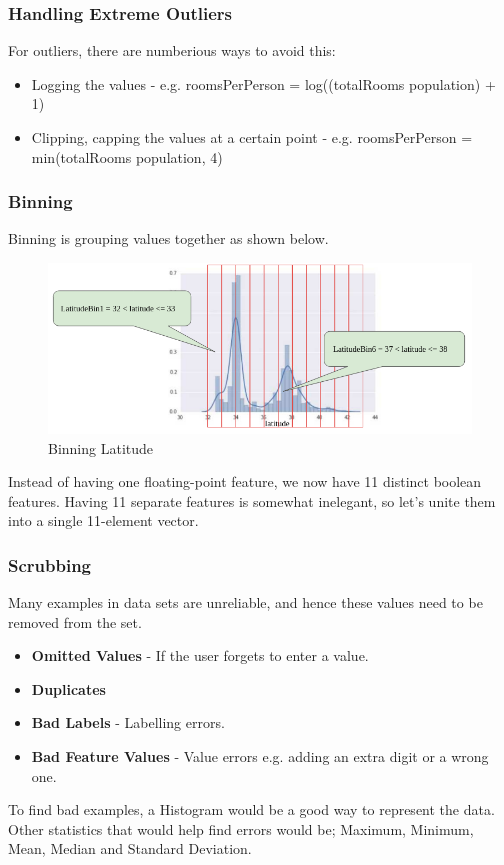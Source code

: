 \documentclass[12pt]{article}
\begin{document}
\subsubsection{Handling Extreme Outliers}
For outliers, there are numberious ways to avoid this:

\begin{itemize}
	\item Logging the values - e.g. roomsPerPerson = log((totalRooms \/ population) + 1)
	\item Clipping, capping the values at a certain point - e.g. roomsPerPerson = min(totalRooms \/ population, 4)
\end{itemize}

\subsubsection{Binning}
Binning is grouping values together as shown below.
\begin{figure}[H]
	\includegraphics[scale = 0.5]{imgs/binning.png}
	\centering
	\caption{Binning Latitude}
\end{figure}
Instead of having one floating-point feature, we now have 11 distinct boolean features. Having 11 separate features is somewhat inelegant, so let's unite them into a single 11-element vector.

\subsubsection{Scrubbing}
Many examples in data sets are unreliable, and hence these values need to be removed from the set.
\begin{itemize}
	\item \textbf{Omitted Values} - If the user forgets to enter a value.
	\item \textbf{Duplicates}
	\item \textbf{Bad Labels} - Labelling errors.
	\item \textbf{Bad Feature Values} - Value errors e.g. adding an extra digit or a wrong one.
\end{itemize}
To find bad examples, a Histogram would be a good way to represent the data. Other statistics that would help find errors would be; Maximum, Minimum, Mean, Median and Standard Deviation.
\end{document}
